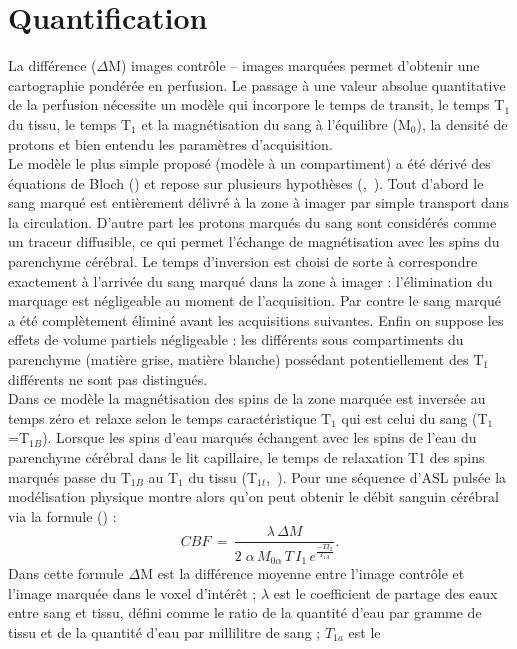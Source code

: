 \section{Quantification}
La différence ($\Delta$M) images contrôle – images marquées permet d’obtenir une cartographie pondérée en perfusion. Le passage à une valeur absolue quantitative de la perfusion nécessite un modèle qui incorpore le temps de transit, le temps T$_1$ du tissu, le temps T$_1$ et la magnétisation du sang à l’équilibre (M$_0$), la densité de protons et bien entendu les paramètres d’acquisition.\\
Le modèle le plus simple proposé (modèle à un compartiment) a été dérivé des équations de Bloch (\cite{Bloch1946}) et repose sur plusieurs hypothèses (\cite{Petersen2006},~\cite{Parkes2005}). Tout d’abord le sang marqué est entièrement délivré à la zone à imager par simple transport dans la circulation. D’autre part les protons marqués du sang sont considérés comme un traceur diffusible, ce qui permet l’échange de magnétisation avec les spins du parenchyme cérébral. Le temps d’inversion est choisi de sorte à correspondre exactement à l’arrivée du sang marqué dans la zone à imager : l’élimination du marquage est négligeable au moment de l’acquisition. Par contre le sang marqué a été complètement éliminé avant les acquisitions suivantes. Enfin on suppose les effets de volume partiels négligeable : les différents sous compartiments du parenchyme (matière grise, matière blanche) possédant potentiellement des T$_1$ différents ne sont pas distingués.\\
Dans ce modèle la magnétisation des spins de la zone marquée est inversée au temps zéro et relaxe selon le temps caractéristique T$_1$ qui est celui du sang (T$_1$=T$_{1B}$). Lorsque les spins d’eau marqués échangent avec les spins de l’eau du parenchyme cérébral dans le lit capillaire, le temps de relaxation T1 des spins marqués passe du T$_{1B}$ au T$_1$ du tissu (T$_{1t}$,~\cite{Luh1999}). Pour une séquence d’ASL pulsée la modélisation physique montre alors qu’on peut obtenir le débit sanguin cérébral via la formule (\cite{Wang2003}) :
\begin{equation}
\label{eq:debit}
CBF\,=\,\frac{\lambda\,\Delta M}{2\;\alpha\,M_{0\alpha}\,T\,I_1\,e^\frac{-T I_2}{T_{1A}}}.
\end{equation}
Dans cette formule $\Delta$M est la différence moyenne entre l’image contrôle et l’image marquée
dans le voxel d’intérêt ; $\lambda$ est le coefficient de partage des eaux entre sang et tissu, défini comme le
ratio de la quantité d’eau par gramme de tissu et de la quantité d’eau par millilitre de sang ; $T_{1a}$ est le
